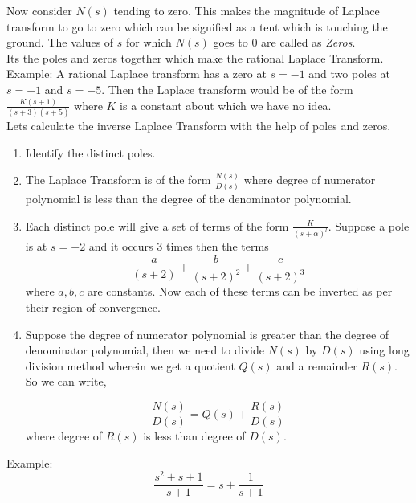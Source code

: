 \noindent
Now consider $N(s)$ tending to zero. This makes the magnitude of Laplace transform to go to zero which can be signified as a tent which is touching the ground. The values of $s$ for which $N(s)$ goes to $0$ are called as \emph{Zeros}.\\

\noindent
Its the poles and zeros together which make the rational Laplace Transform.\\

\noindent
Example: A rational Laplace transform has a zero at $s=-1$ and two poles at $s=-1$ and $s=-5$. Then the Laplace transform would be of the form $\frac{K(s+1)}{(s+3)(s+5)}$ where $K$ is a constant about which we have no idea. \\

\noindent
Lets calculate the inverse Laplace Transform with the help of poles and zeros.\\

\begin{enumerate}
\item Identify the distinct poles.
\item The Laplace Transform is of the form $\frac{N(s)}{D(s)}$ where degree of numerator polynomial is less than the degree of the denominator polynomial. 
\item Each distinct pole will give a set of terms of the form $\frac{K}{(s+\alpha)^l}$.
Suppose a pole is at $s= -2$ and it occurs $3$ times then the terms 
  \begin{equation}
	\frac{a}{(s+2)} + \frac{b}{(s+2)^2} + \frac{c}{(s+2)^3}
\end{equation}
where $a, b, c$ are constants. Now each of these terms can be inverted as per their region of convergence.

\item Suppose the degree of numerator polynomial is greater than the degree of denominator polynomial, then we need to divide $N(s)$ by $D(s)$ using long division method wherein we get a quotient $Q(s)$ and a remainder $R(s)$. So we can write,

\begin{equation}
\frac{N(s)}{D(s)} = Q(s) + \frac{R(s)}{D(s)}
\end{equation}
where degree of $R(s)$ is less than degree of $D(s)$.
\end{enumerate}

\noindent
Example:
\begin{equation}
\frac{s^2+s+1}{s+1} = s + \frac{1}{s+1}
\end{equation}

